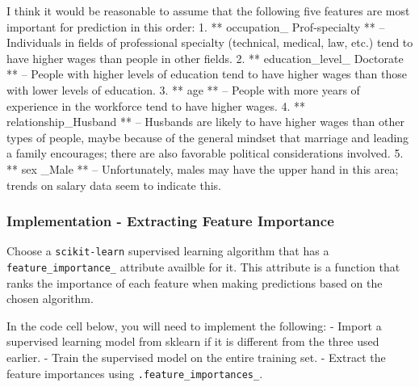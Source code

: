 \documentclass[11pt]{article}
\begin{document}
I think it would be reasonable to assume that the following five
features are most important for prediction in this order: 1. **
occupation\_ Prof-specialty ** -- Individuals in fields of professional
specialty (technical, medical, law, etc.) tend to have higher wages than
people in other fields. 2. ** education\_level\_ Doctorate ** -- People
with higher levels of education tend to have higher wages than those
with lower levels of education. 3. ** age ** -- People with more years
of experience in the workforce tend to have higher wages. 4. **
relationship\_Husband ** -- Husbands are likely to have higher wages
than other types of people, maybe because of the general mindset that
marriage and leading a family encourages; there are also favorable
political considerations involved. 5. ** sex \_Male ** -- Unfortunately,
males may have the upper hand in this area; trends on salary data seem
to indicate this.

    \hypertarget{implementation---extracting-feature-importance}{%
\subsubsection{Implementation - Extracting Feature
Importance}\label{implementation---extracting-feature-importance}}

Choose a \texttt{scikit-learn} supervised learning algorithm that has a
\texttt{feature\_importance\_} attribute availble for it. This attribute
is a function that ranks the importance of each feature when making
predictions based on the chosen algorithm.

In the code cell below, you will need to implement the following: -
Import a supervised learning model from sklearn if it is different from
the three used earlier. - Train the supervised model on the entire
training set. - Extract the feature importances using
\texttt{\textquotesingle{}.feature\_importances\_\textquotesingle{}}.
\end{document}
